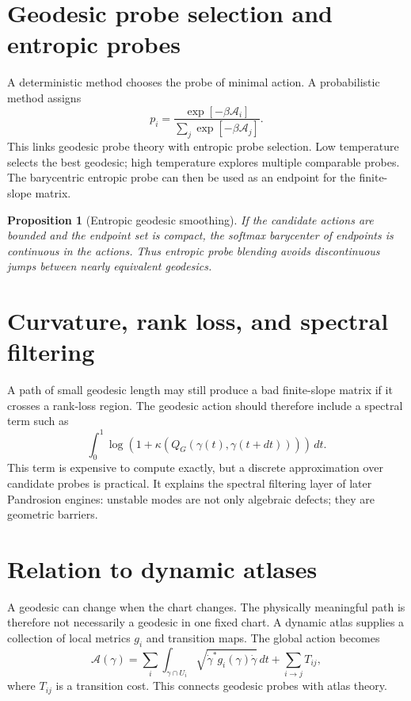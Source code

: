 \documentclass[11pt]{article}
\newtheorem{proposition}[definition]{Proposition}
\begin{document}
\section{Geodesic probe selection and entropic probes}
A deterministic method chooses the probe of minimal action.  A probabilistic method assigns
\[
        p_i=\frac{\exp[-\beta \mathcal A_i]}{\sum_j\exp[-\beta\mathcal A_j]}.
\]
This links geodesic probe theory with entropic probe selection.  Low temperature selects the best geodesic; high temperature explores multiple comparable probes.  The barycentric entropic probe can then be used as an endpoint for the finite-slope matrix.

\begin{proposition}[Entropic geodesic smoothing]
If the candidate actions are bounded and the endpoint set is compact, the softmax barycenter of endpoints is continuous in the actions.  Thus entropic probe blending avoids discontinuous jumps between nearly equivalent geodesics.
\end{proposition}

\section{Curvature, rank loss, and spectral filtering}
A path of small geodesic length may still produce a bad finite-slope matrix if it crosses a rank-loss region.  The geodesic action should therefore include a spectral term such as
\[
        \int_0^1 \log(1+\kappa(Q_G(\gamma(t),\gamma(t+dt))))\,dt.
\]
This term is expensive to compute exactly, but a discrete approximation over candidate probes is practical.  It explains the spectral filtering layer of later Pandrosion engines: unstable modes are not only algebraic defects; they are geometric barriers.

\section{Relation to dynamic atlases}
A geodesic can change when the chart changes.  The physically meaningful path is therefore not necessarily a geodesic in one fixed chart.  A dynamic atlas supplies a collection of local metrics $g_i$ and transition maps.  The global action becomes
\[
        \mathcal A(\gamma)=\sum_i\int_{\gamma\cap U_i}\sqrt{\dot\gamma^*g_i(\gamma)\dot\gamma}\,dt + \sum_{i\to j} T_{ij},
\]
where $T_{ij}$ is a transition cost.  This connects geodesic probes with atlas theory.
\end{document}

